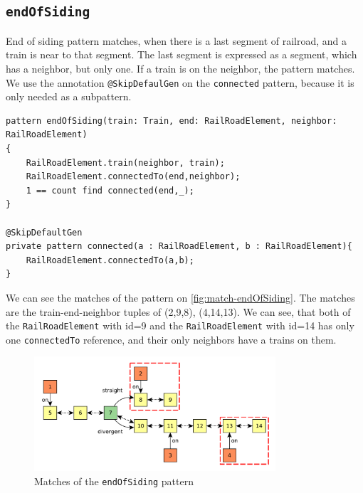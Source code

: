 \subsection{\texttt{endOfSiding}}

End of siding pattern matches, when there is a last segment of railroad, and a train is near to that segment.
The last segment is expressed as a segment, which has a neighbor, but only one.
If a train is on the neighbor, the pattern matches.
We use the annotation \texttt{@SkipDefaulGen} on the \texttt{connected} pattern, because it is only needed as a subpattern.

\begin{minipage}{\textwidth}
\begin{lstlisting}[language = vql]
pattern endOfSiding(train: Train, end: RailRoadElement, neighbor: RailRoadElement)
{
	RailRoadElement.train(neighbor, train);		
	RailRoadElement.connectedTo(end,neighbor);
	1 == count find connected(end,_);	
}

@SkipDefaultGen
private pattern connected(a : RailRoadElement, b : RailRoadElement){
	RailRoadElement.connectedTo(a,b);
}
\end{lstlisting}

\end{minipage}

We can see the matches of the pattern on \autoref{fig:match-endOfSiding}. 
The matches are the train-end-neighbor tuples of (2,9,8), (4,14,13). 
We can see, that both of the \texttt{RailRoadElement} with id=9 and the \texttt{RailRoadElement} with id=14 has only one \texttt{connectedTo} reference, and their only neighbors have a trains on them.

\begin{figure}[H]
	\begin{center}
		\includegraphics[width=0.8\textwidth]{figures/query-example-model-endofsiding.pdf}
	\end{center}
	\caption{Matches of the \texttt{endOfSiding} pattern}
	\label{fig:match-endOfSiding}
\end{figure}



